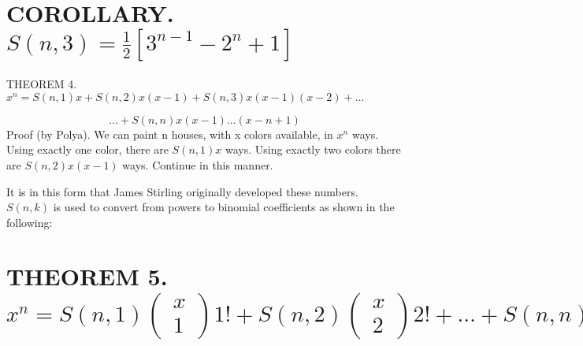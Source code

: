 \documentclass{article}
\begin{document}
\section[COROLLARY. \ \ \ \ \ ]{COROLLARY.   $S\left(n,3\right)=\frac 1 2\left[3^{n-1}-2^n+1\right]$ }
THEOREM 4.  
$x^n=S\left(n,1\right)x+S\left(n,2\right)x\left(x-1\right)+S\left(n,3\right)x\left(x-1\right)\left(x-2\right)+{\dots}$

\begin{equation*}
{\dots}+S\left(n,n\right)x\left(x-1\right){\dots}(x-n+1)
\end{equation*}
Proof (by Polya). We can paint n houses, with x colors available, in  $x^n$ ways. Using exactly one color, there are 
$S\left(n,1\right)x$ ways. Using exactly two colors there are  $S\left(n,2\right)x(x-1)$ ways. Continue in this manner.


It is in this form that James Stirling originally developed these numbers.  $S(n,k)$ is used to convert from powers to
binomial coefficients as shown in the following: 

\section[THEOREM 5. \ \ \ \ \ \ \  ]{THEOREM 5.  
$x^n=S\left(n,1\right)\left(\begin{matrix}x\\1\end{matrix}\right)1!+S\left(n,2\right)\left(\begin{matrix}x\\2\end{matrix}\right)2!+{\dots}+S\left(n,n\right)\left(\begin{matrix}n\\n\end{matrix}\right)n!$
}
\section{}
\section{}
\section{}
\section{}
\section{}
\end{document}
